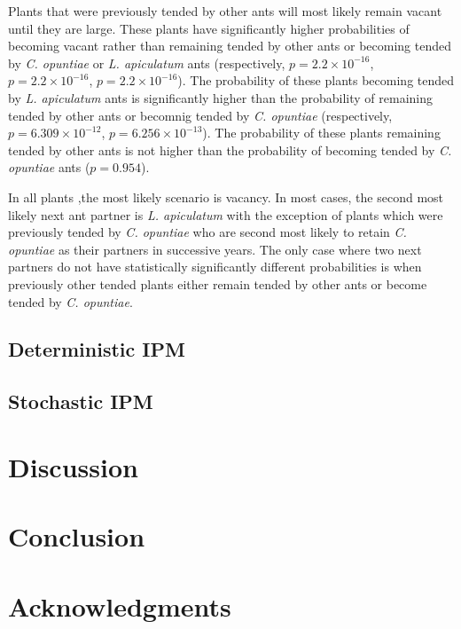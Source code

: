 \documentclass[11pt]{article}
\begin{document}
Plants that were previously tended by other ants will most likely remain vacant until they are large. 
These plants have significantly higher probabilities of becoming vacant rather than remaining tended by other ants or becoming tended by \textit{C. opuntiae} or \textit{L. apiculatum} ants (respectively, $p = 2.2 \times 10^{-16}$, $p = 2.2 \times 10^{-16}$, $p = 2.2 \times 10^{-16}$).
The probability of these plants becoming tended by \textit{L. apiculatum} ants is significantly higher than the probability of remaining tended by other ants or becomnig tended by \textit{C. opuntiae} (respectively, $p = 6.309 \times 10^{-12}$, $p = 6.256 \times 10^{-13}$).
The probability of these plants remaining tended by other ants is not higher than the probability of becoming tended by \textit{C. opuntiae} ants ($p = 0.954$). 

In all plants ,the most likely scenario is vacancy.
In most cases, the second most likely next ant partner is \textit{L. apiculatum} with the exception of plants which were previously tended by \textit{C. opuntiae} who are second most likely to retain \textit{C. opuntiae} as their partners in successive years.
The only case where two next partners do not have statistically significantly different probabilities is when previously other tended plants either remain tended by other ants or become tended by \textit{C. opuntiae}. 

\subsection*{Deterministic IPM}

\subsection*{Stochastic IPM}


\section*{Discussion}


\section*{Conclusion}

\section*{Acknowledgments}
\end{document}
